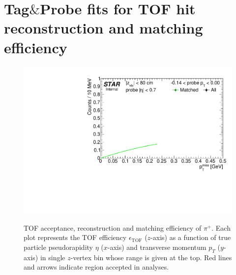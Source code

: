 
\chapter{Tag\texorpdfstring{$\&$}{&}Probe fits for TOF hit reconstruction and matching efficiency}\label{appendix:tagAndProbeTofEff}


\begin{figure}[h!]
\caption[TOF acceptance, reconstruction and matching efficiency of $\pi^{+}$.]{TOF acceptance, reconstruction and matching efficiency of $\pi^{+}$. Each plot represents the TOF efficiency $\epsilon_{\text{TOF}}$ ($z$-axis) as a function of true particle pseudorapidity $\eta$ ($x$-axis) and transverse momentum $p_{T}$ ($y$-axis) in single $z$-vertex bin whose range is given at the top. Red lines and arrows indicate region accepted in analyses.}\label{fig:tagAndProbeTofEffFits_Pt}
\centering
\parbox{0.495\textwidth}{
  \centering
  \includegraphics[width=\linewidth,page=4]{graphics/systematicsEfficiency/TOF_tagAndProbe/Fitting_effVsPt_data.pdf}\\
}
\end{figure}

